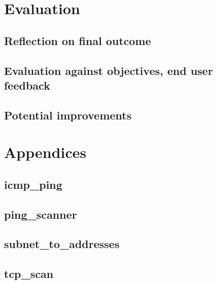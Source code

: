 \documentclass[titlepage]{article}
\let\Oldsection\section{}
\renewcommand{\section}{\FloatBarrier\Oldsection}
\let\Oldsubsection\subsection{}
\renewcommand{\subsection}{\FloatBarrier\Oldsubsection}
\begin{document}
\section{Evaluation}

\subsection{Reflection on final outcome}

\subsection{Evaluation against objectives, end user feedback}

\subsection{Potential improvements}

\section{Appendices}
\lstset{language=python}

\subsection{icmp\_ping}



\subsection{ping\_scanner}


\subsection{subnet\_to\_addresses}


\subsection{tcp\_scan}
\end{document}
